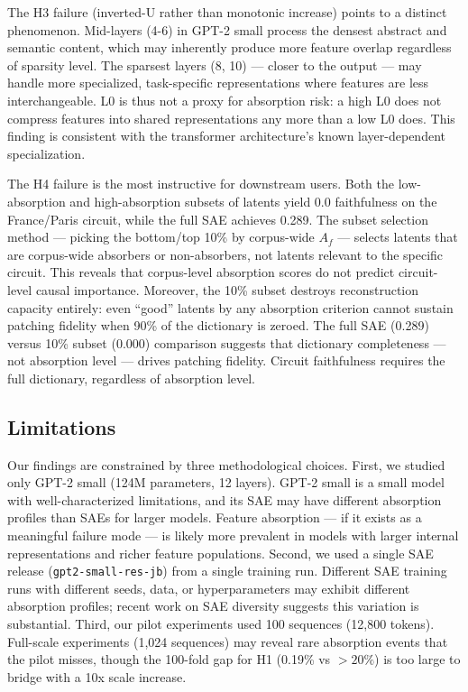\documentclass{article}
\begin{document}
The H3 failure (inverted-U rather than monotonic increase) points to a distinct phenomenon. Mid-layers (4-6) in GPT-2 small process the densest abstract and semantic content, which may inherently produce more feature overlap regardless of sparsity level. The sparsest layers (8, 10) --- closer to the output --- may handle more specialized, task-specific representations where features are less interchangeable. L0 is thus not a proxy for absorption risk: a high L0 does not compress features into shared representations any more than a low L0 does. This finding is consistent with the transformer architecture's known layer-dependent specialization.

The H4 failure is the most instructive for downstream users. Both the low-absorption and high-absorption subsets of latents yield 0.0 faithfulness on the France/Paris circuit, while the full SAE achieves 0.289. The subset selection method --- picking the bottom/top 10\% by corpus-wide $A_f$ --- selects latents that are corpus-wide absorbers or non-absorbers, not latents relevant to the specific circuit. This reveals that corpus-level absorption scores do not predict circuit-level causal importance. Moreover, the 10\% subset destroys reconstruction capacity entirely: even ``good'' latents by any absorption criterion cannot sustain patching fidelity when 90\% of the dictionary is zeroed. The full SAE (0.289) versus 10\% subset (0.000) comparison suggests that dictionary completeness --- not absorption level --- drives patching fidelity. Circuit faithfulness requires the full dictionary, regardless of absorption level.

\subsection{Limitations}

Our findings are constrained by three methodological choices. First, we studied only GPT-2 small (124M parameters, 12 layers). GPT-2 small is a small model with well-characterized limitations, and its SAE may have different absorption profiles than SAEs for larger models. Feature absorption --- if it exists as a meaningful failure mode --- is likely more prevalent in models with larger internal representations and richer feature populations. Second, we used a single SAE release (\texttt{gpt2-small-res-jb}) from a single training run. Different SAE training runs with different seeds, data, or hyperparameters may exhibit different absorption profiles; recent work on SAE diversity suggests this variation is substantial. Third, our pilot experiments used 100 sequences (12,800 tokens). Full-scale experiments (1,024 sequences) may reveal rare absorption events that the pilot misses, though the 100-fold gap for H1 (0.19\% vs $>20\%$) is too large to bridge with a 10x scale increase.
\end{document}

